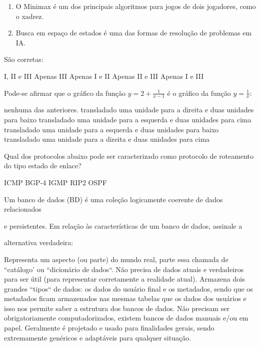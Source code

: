 \documentclass[12pt, addpoints]{exam}
\begin{document}
\begin{questions}
\begin{enumerate}[label=\Roman*.]
    \item O Minimax é um dos principais algoritmos para jogos de dois jogadores, como o xadrez.

    \item Busca em espaço de estados é uma das formas de resolução de problemas em IA.

\end{enumerate}

São corretas:
\begin{choices}
\choice I, II e III
\choice Apenas III
\choice Apenas I e II
\choice Apenas II e III
\choice Apenas I e III
\end{choices}

\question

Pode-se afirmar que o gráfico da função \(y = 2 + \frac{1}{x - 1}\) é o gráfico da função \(y = \frac{1}{x}\):
\begin{choices}
\choice nenhuma das anteriores.
\choice transladado uma unidade para a direita e duas unidades para baixo
\choice transladado uma unidade para a esquerda e duas unidades para cima
\choice transladado uma unidade para a esquerda e duas unidades para baixo
\choice transladado uma unidade para a direita e duas unidades para cima
\end{choices}

\question

Qual dos protocolos abaixo pode ser caracterizado como protocolo de roteamento do tipo estado de enlace?
\begin{choices}
\choice ICMP
\choice BGP-4
\choice IGMP
\choice RIP2
\choice OSPF
\end{choices}

\question

Um banco de dados (BD) é uma coleção logicamente coerente de dados relacionados

e persistentes. Em relação às características de um banco de dados, assinale a

alternativa verdadeira:
\begin{choices}
\choice Representa um aspecto (ou parte) do mundo real, parte essa chamada de ``catálogo' ou ``dicionário de dados``.
\choice Não precisa de dados atuais e verdadeiros para ser útil (para representar corretamente a realidade atual).
\choice Armazena dois grandes ``tipos`` de dados: os dados do usuário final e os metadados, sendo que os metadados ficam armazenados nas mesmas tabelas que os dados dos usuários e isso nos permite saber a estrutura dos bancos de dados.
\choice Não precisam ser obrigatoriamente computadorizados, existem bancos de dados manuais e/ou em papel.
\choice Geralmente é projetado e usado para finalidades gerais, sendo extremamente genéricos e adaptáveis para qualquer situação.
\end{choices}


\end{questions}
\end{document}

